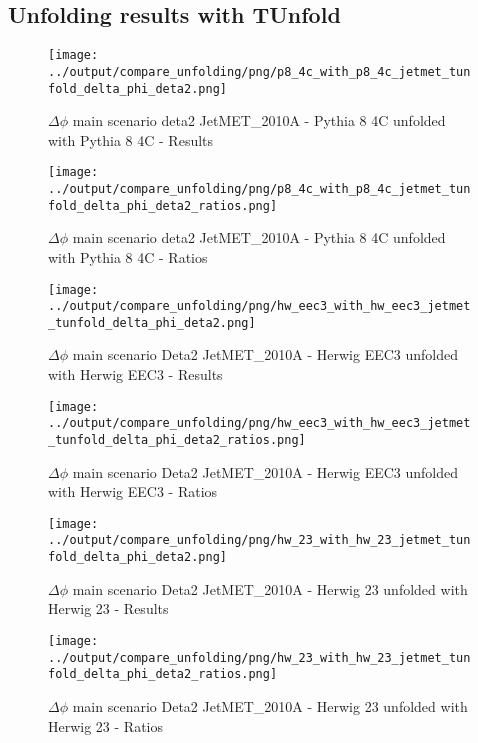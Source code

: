 \documentclass[11pt]{book}
\begin{document}
\clearpage
\subsection{Unfolding results with TUnfold}

\begin{figure}[ht]
\centering
\texttt{[image: ../output/compare\_unfolding/png/p8\_4c\_with\_p8\_4c\_jetmet\_tunfold\_delta\_phi\_deta2.png]}
\caption{$\Delta\phi$ main scenario deta2 JetMET\_2010A - Pythia 8 4C unfolded with Pythia 8 4C - Results}
\label{p8_p8_jetmet_tunfold_delta_phi_deta2_a}
\end{figure}

\begin{figure}[ht]
\centering
\texttt{[image: ../output/compare\_unfolding/png/p8\_4c\_with\_p8\_4c\_jetmet\_tunfold\_delta\_phi\_deta2\_ratios.png]}
\caption{$\Delta\phi$ main scenario deta2 JetMET\_2010A - Pythia 8 4C unfolded with Pythia 8 4C - Ratios}
\label{p8_p8_jetmet_tunfold_delta_phi_deta2_b}
\end{figure}

\begin{figure}[ht]
\centering
\texttt{[image: ../output/compare\_unfolding/png/hw\_eec3\_with\_hw\_eec3\_jetmet\_tunfold\_delta\_phi\_deta2.png]}
\caption{$\Delta\phi$ main scenario Deta2 JetMET\_2010A - Herwig EEC3 unfolded with Herwig EEC3 - Results}
\label{hw_eec3_hw_eec3_jetmet_tunfold_delta_phi_deta2_a}
\end{figure}

\begin{figure}[ht]
\centering
\texttt{[image: ../output/compare\_unfolding/png/hw\_eec3\_with\_hw\_eec3\_jetmet\_tunfold\_delta\_phi\_deta2\_ratios.png]}
\caption{$\Delta\phi$ main scenario Deta2 JetMET\_2010A - Herwig EEC3 unfolded with Herwig EEC3 - Ratios}
\label{hw_eec3_hw_eec3_jetmet_tunfold_delta_phi_deta2_b}
\end{figure}

\begin{figure}[ht]
\centering
\texttt{[image: ../output/compare\_unfolding/png/hw\_23\_with\_hw\_23\_jetmet\_tunfold\_delta\_phi\_deta2.png]}
\caption{$\Delta\phi$ main scenario Deta2 JetMET\_2010A - Herwig 23 unfolded with Herwig 23 - Results}
\label{hw_23_hw_23_jetmet_tunfold_delta_phi_deta2_a}
\end{figure}

\begin{figure}[ht]
\centering
\texttt{[image: ../output/compare\_unfolding/png/hw\_23\_with\_hw\_23\_jetmet\_tunfold\_delta\_phi\_deta2\_ratios.png]}
\caption{$\Delta\phi$ main scenario Deta2 JetMET\_2010A - Herwig 23 unfolded with Herwig 23 - Ratios}
\label{hw_23_hw_23_jetmet_tunfold_delta_phi_deta2_b}
\end{figure}
\end{document}
